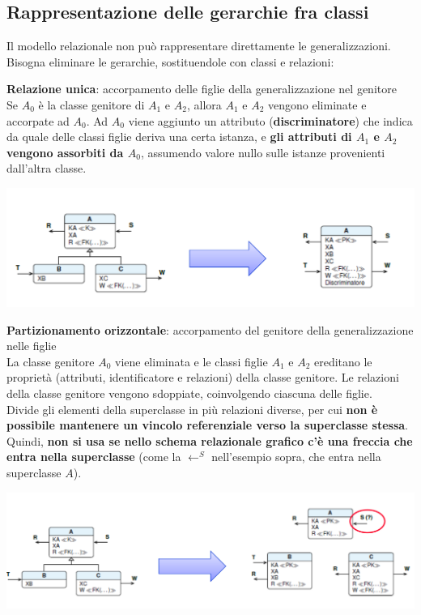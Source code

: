 \documentclass[10pt]{book}
\begin{document}
\subsection{Rappresentazione delle gerarchie fra classi}
Il modello relazionale non può rappresentare direttamente le generalizzazioni. Bisogna eliminare le gerarchie, sostituendole con classi e relazioni:
\begin{list}{}{}
	\item \textbf{Relazione unica}: accorpamento delle figlie della generalizzazione nel genitore\\
	Se $A_0$ è la classe genitore di $A_1$ e $A_2$, allora $A_1$ e $A_2$ vengono eliminate e accorpate ad $A_0$. Ad $A_0$ viene aggiunto un attributo (\textbf{discriminatore}) che indica da quale delle classi figlie deriva una certa istanza, e \textbf{gli attributi di $A_1$ e $A_2$ vengono assorbiti da $A_0$}, assumendo valore nullo sulle istanze provenienti dall'altra classe.
	\begin{center}
		\includegraphics[scale=0.5]{relazunica.png}
	\end{center}
	\item \textbf{Partizionamento orizzontale}: accorpamento del genitore della generalizzazione nelle figlie\\
	La classe genitore $A_0$ viene eliminata e le classi figlie $A_1$ e $A_2$ ereditano le proprietà (attributi, identificatore e relazioni) della classe genitore. Le relazioni della classe genitore vengono sdoppiate, coinvolgendo ciascuna delle figlie.\\
	Divide gli elementi della superclasse in più relazioni diverse, per cui \textbf{non è possibile mantenere un vincolo referenziale verso la superclasse stessa}. Quindi, \textbf{non si usa se nello schema relazionale grafico c'è una freccia che entra nella superclasse} (come la $\leftarrow^S$ nell'esempio sopra, che entra nella superclasse $A$).
	\begin{center}
		\includegraphics[scale=0.45]{partorizz.png}

\end{center}
\end{list}
\end{document}
